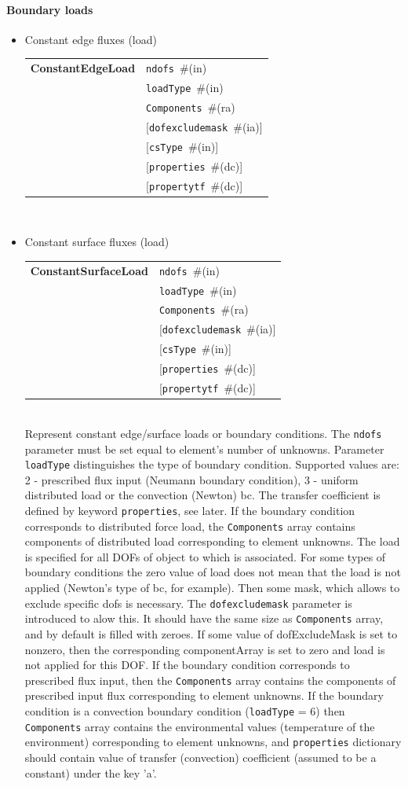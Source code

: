 \documentclass[a4paper]{article}
\makeatletter
\newcommand{\param}[1]{\texttt{#1}} %
\newcommand{\optional}[1]{[#1]} %
\newcommand{\field}[2]{\param{#1}~\#{\tiny(#2)}} %
\newcommand{\optField}[2]{\optional{\field{#1}{#2}}}
\newcommand{\entKeywordInst}[1]{\textbf{#1}} %
\newenvironment{record}[1][]{\begin{tabular}{|ll}}{\end{tabular}\\}
\newcommand{\recentry}[2]{{#1}&{#2}\\}
\newcounter{rcc}
\newenvironment{record}[1][\textwidth]{\setcounter{rcc}{0}\begin{tabular*}{#1}{|ll@{\extracolsep{\fill}}r}}{\end{tabular*}\\}
\newcommand{\recentry}[2]{\ifthenelse{\value{rcc}>0}{&$\backslash$ \\}{\setcounter{rcc}{1}}{#1}&{#2}}
\makeatother
\begin{document}
\paragraph{Boundary loads}
\begin{itemize}
\item Constant edge fluxes (load)

\begin{record}[0.9\textwidth]
  \recentry{\entKeywordInst{ConstantEdgeLoad}}{\field{ndofs}{in}}
  \recentry{}{\field{loadType}{in}}
  \recentry{}{\field{Components}{ra}}
  \recentry{}{\optField{dofexcludemask}{ia}}
  \recentry{}{\optField{csType}{in}}
  \recentry{}{\optField{properties}{dc}}
  \recentry{}{\optField{propertytf}{dc}}
\end{record}
\item Constant surface fluxes (load)

\begin{record}[0.9\textwidth]
  \recentry{\entKeywordInst{ConstantSurfaceLoad}}{\field{ndofs}{in}}
  \recentry{}{\field{loadType}{in}}
  \recentry{}{\field{Components}{ra}}
  \recentry{}{\optField{dofexcludemask}{ia}}
  \recentry{}{\optField{csType}{in}}
  \recentry{}{\optField{properties}{dc}}
  \recentry{}{\optField{propertytf}{dc}}
\end{record}
Represent constant edge/surface loads or boundary conditions. The \param{ndofs} parameter must be set
equal to element's number of unknowns. Parameter \param{loadType}
distinguishes the type of boundary condition. Supported values are:
2 - prescribed flux input (Neumann boundary condition), 3 - uniform distributed load or the convection (Newton) bc. The transfer coefficient is defined by keyword \param{properties}, see later.
If the boundary condition corresponds to distributed force load, the
\param{Components} array contains components of distributed load
corresponding to element unknowns.
The load is specified for all DOFs of object to which is associated.
For some types of boundary conditions the zero value of load does not mean
that the load is not applied (Newton's type of bc, for example). Then
some mask, which allows to exclude specific dofs is necessary.
The \param{dofexcludemask} parameter is introduced to alow this.
It should have the same size as \param{Components} array, and by
default is filled with zeroes. If some value of dofExcludeMask is set
to nonzero, then the corresponding componentArray
is set to zero and load is not applied for this DOF.
If the boundary condition corresponds to prescribed flux input, then
the \param{Components} array contains the components of prescribed
input flux corresponding to element unknowns.
If the boundary condition is a convection boundary condition
(\param{loadType} = 6) then \param{Components} array contains the
environmental values (temperature of the environment) corresponding to
element unknowns, and \param{properties} dictionary should contain
value of transfer (convection) coefficient (assumed to be a constant) under the key 'a'.


\end{itemize}
\end{document}
